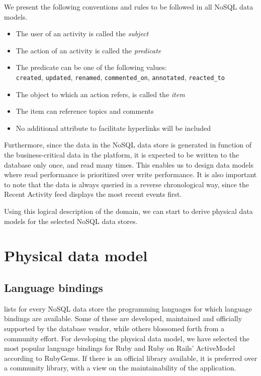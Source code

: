 We present the following conventions and rules to be followed in all NoSQL data models.

\begin{itemize}
  \item The user of an activity is called the \textit{subject}
  \item The action of an activity is called the \textit{predicate}
  \item The predicate can be one of the following values:\\ \texttt{created}, \texttt{updated}, \texttt{renamed}, \texttt{commented\_on}, \texttt{annotated}, \texttt{reacted\_to}
  \item The object to which an action refers, is called the \textit{item}
  \item The item can reference topics and comments
  \item No additional attribute to facilitate hyperlinks will be included
\end{itemize}

Furthermore, since the data in the NoSQL data store is generated in function of the business-critical data in the platform, it is expected to be written to the database only once, and read many times.
This enables us to design data models where read performance is prioritized over write performance.
It is also important to note that the data is always queried in a reverse chronological way, since the Recent Activity feed displays the most recent events first.

Using this logical description of the domain, we can start to derive physical data models for the selected NoSQL data stores.

\section{Physical data model}
\label{sec:physical-data-model}

\subsection{Language bindings}
\label{subsec:language-bindings}

 lists for every NoSQL data store the programming languages for which language bindings are available.
Some of these are developed, maintained and officially supported by the database vendor, while others blossomed forth from a community effort.
For developing the physical data model, we have selected the most popular language bindings for Ruby and Ruby on Rails' ActiveModel according to RubyGems.
If there is an official library available, it is preferred over a community library, with a view on the maintainability of the application.

